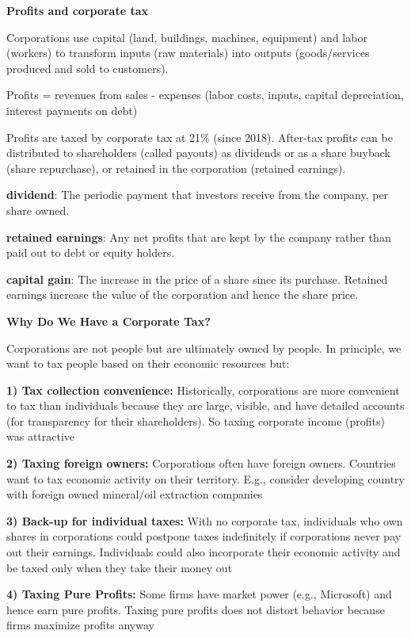 \documentclass[landscape]{slides}
\begin{document}
\begin{slide}
\begin{center}
{\bf Profits and corporate tax}
\end{center}

Corporations use capital (land, buildings, machines, equipment) and labor (workers) to transform inputs (raw materials) into outputs (goods/services produced and sold to customers).

Profits = revenues from sales - expenses (labor costs, inputs, capital depreciation, interest payments on debt)

Profits are taxed by corporate tax at 21\% (since 2018). After-tax profits can be distributed to shareholders (called payouts)
as dividends or as a share buyback (share repurchase), or retained in the corporation (retained earnings).

\small
{\bf dividend}:
The periodic payment that investors receive from the company, per share owned.

{\bf retained earnings}:
Any net profits that are kept by the company rather than paid out to debt or equity holders.

{\bf capital gain}:
The increase in the price of a share since its purchase. Retained earnings increase the value
of the corporation and hence the share price.

\end{slide}

\begin{slide}
\begin{center}
{\bf Why Do We Have a Corporate Tax?}
\end{center}
Corporations are not people but are ultimately owned by people. In principle, we want to tax people based on their economic resources but:

\small

{\bf 1) Tax collection convenience:} Historically, corporations are more convenient to tax than individuals because
they are large, visible, and have detailed accounts (for transparency for their shareholders). So taxing
corporate income (profits) was attractive

{\bf 2) Taxing foreign owners:} Corporations often have foreign owners. Countries want to tax economic
activity on their territory. E.g., consider developing country with foreign owned mineral/oil extraction companies

{\bf 3) Back-up for individual taxes:} With no corporate tax,
individuals who own shares in corporations could postpone taxes indefinitely if corporations
never pay out their earnings. Individuals could also incorporate their economic activity and
be taxed only when they take their money out

{\bf 4) Taxing Pure Profits:} Some firms have market power (e.g., Microsoft) and hence earn pure profits.
Taxing pure profits does not distort behavior because firms maximize profits anyway

\end{slide}
\end{document}
